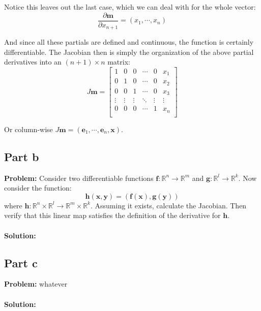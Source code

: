 \documentclass{article}
\begin{document}
Notice this leaves out the last case, which we can deal with for the whole vector:
$$\frac{\partial \mathbf m}{\partial x_{n+1}}=(x_1,\cdots,x_n)$$

And since all these partials are defined and continuous, the function is certainly differentiable. The Jacobian then is simply the organization of the above partial derivatives into an $(n+1)\times n$ matrix:
$$J\mathbf m=
\begin{bmatrix}
    1 & 0 & 0 & \cdots & 0 & x_1 \\
    0 & 1 & 0 & \cdots & 0 & x_2 \\
    0 & 0 & 1 & \cdots & 0 & x_3 \\
    \vdots & \vdots & \vdots & \ddots & \vdots & \vdots\\
    0 & 0 & 0 & \cdots & 1 & x_n \\
\end{bmatrix}$$

Or column-wise $J\mathbf m=(\mathbf e_1,\cdots,\mathbf e_n,\mathbf x)$.

\subsection*{Part b}
\textbf{Problem:} Consider two differentiable functions $\mathbf f:\mathbb R^n\to\mathbb R^m$ and $\mathbf g:\mathbb R^l\to\mathbb R^k$. Now consider the function:
$$\mathbf h(\mathbf x,\mathbf y)=(\mathbf f(\mathbf x),\mathbf g(\mathbf y))$$
where $\mathbf h:\mathbb R^n\times\mathbb R^l\to\mathbb R^m\times\mathbb R^k$. Assuming it exists, calculate the Jacobian. Then verify that this linear map satisfies the definition of the derivative for $\mathbf h$.
\\\\
\textbf{Solution:}

\subsection*{Part c}
\textbf{Problem:} whatever
\\\\
\textbf{Solution:}
\end{document}
